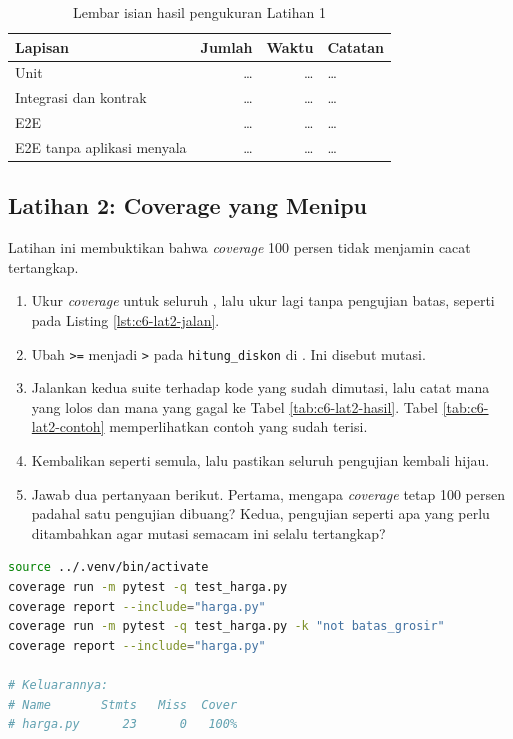 \begin{table}[!htb]
  \centering
  \caption{Lembar isian hasil pengukuran Latihan 1}
  \label{tab:c6-lat1-hasil}
  \begin{tabularx}{\textwidth}{lrrX}
    \hline
    \textbf{Lapisan} & \textbf{Jumlah} & \textbf{Waktu} & \textbf{Catatan} \\
    \hline
    Unit & \dots & \dots & \dots \\
    \hline
    Integrasi dan kontrak & \dots & \dots & \dots \\
    \hline
    E2E & \dots & \dots & \dots \\
    \hline
    E2E tanpa aplikasi menyala & \dots & \dots & \dots \\
    \hline
  \end{tabularx}
\end{table}

\subsection*{Latihan 2: Coverage yang Menipu}

Latihan ini membuktikan bahwa \textit{coverage} 100 persen tidak menjamin
cacat tertangkap.

\begin{enumerate}
  \item Ukur \textit{coverage}  untuk seluruh
        , lalu ukur lagi tanpa pengujian batas,
        seperti pada Listing \ref{lst:c6-lat2-jalan}.
  \item Ubah \texttt{>=} menjadi \texttt{>} pada \texttt{hitung\_diskon} di
        . Ini disebut mutasi.
  \item Jalankan kedua suite terhadap kode yang sudah dimutasi, lalu catat
        mana yang lolos dan mana yang gagal ke Tabel \ref{tab:c6-lat2-hasil}. Tabel \ref{tab:c6-lat2-contoh}
        memperlihatkan contoh yang sudah terisi.
  \item Kembalikan  seperti semula, lalu pastikan seluruh
        pengujian kembali hijau.
  \item Jawab dua pertanyaan berikut. Pertama, mengapa \textit{coverage}
        tetap 100 persen padahal satu pengujian dibuang? Kedua, pengujian
        seperti apa yang perlu ditambahkan agar mutasi semacam ini selalu
        tertangkap?
\end{enumerate}

\begin{lstlisting}[language=bash, caption={Mengukur coverage dua kali dan menjalankan mutasi, memakai \berkas{sources/chapter06/harga.py}}, label={lst:c6-lat2-jalan}]
source ../.venv/bin/activate
coverage run -m pytest -q test_harga.py
coverage report --include="harga.py"
coverage run -m pytest -q test_harga.py -k "not batas_grosir"
coverage report --include="harga.py"

# Keluarannya:
# Name       Stmts   Miss  Cover
# harga.py      23      0   100%
\end{lstlisting}

